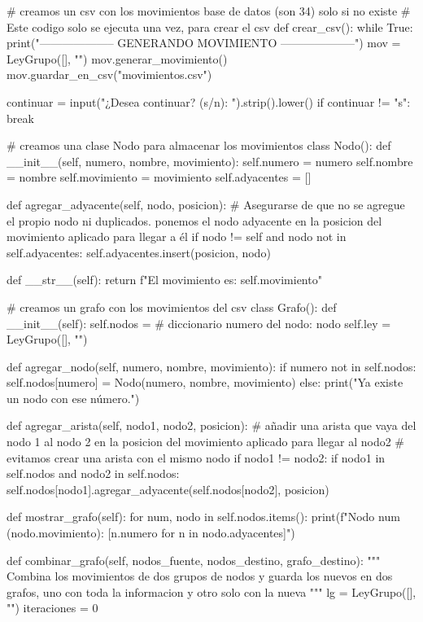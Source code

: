 # creamos un csv con los movimientos base de datos (son 34) solo si no existe
# Este codigo solo se ejecuta una vez, para crear el csv
def crear_csv():
    while True:
        print("-------------------- GENERANDO MOVIMIENTO --------------------")
        mov = LeyGrupo([], "")
        mov.generar_movimiento()
        mov.guardar_en_csv("movimientos.csv")
        
        continuar = input("¿Desea continuar? (s/n): ").strip().lower()
        if continuar != "s":
            break
        

# creamos una clase Nodo para almacenar los movimientos
class Nodo():
    def __init__(self, numero, nombre, movimiento):
        self.numero = numero
        self.nombre = nombre
        self.movimiento = movimiento
        self.adyacentes = []
    
    def agregar_adyacente(self, nodo, posicion):
        # Asegurarse de que no se agregue el propio nodo ni duplicados. ponemos el nodo adyacente en la posicion del movimiento aplicado para llegar a él
        if nodo != self and nodo not in self.adyacentes:
            self.adyacentes.insert(posicion, nodo)
            
    def __str__(self):
        return f"El movimiento es: {self.movimiento}"    

# creamos un grafo con los movimientos del csv
class Grafo():
    def __init__(self):
        self.nodos = {} # diccionario {numero del nodo: nodo}
        self.ley = LeyGrupo([], "")
    
    def agregar_nodo(self, numero, nombre, movimiento):
        if numero not in self.nodos:
            self.nodos[numero] = Nodo(numero, nombre, movimiento)
        else:
            print("Ya existe un nodo con ese número.")
    
    def agregar_arista(self, nodo1, nodo2, posicion):
        # añadir una arista que vaya del nodo 1 al nodo 2 en la posicion del movimiento aplicado para llegar al nodo2
        # evitamos crear una arista con el mismo nodo
        if nodo1 != nodo2:
            if nodo1 in self.nodos and nodo2 in self.nodos:
                self.nodos[nodo1].agregar_adyacente(self.nodos[nodo2], posicion)            
    
    def mostrar_grafo(self):
        for num, nodo in self.nodos.items():
            print(f"Nodo {num} ({nodo.movimiento}): {[n.numero for n in nodo.adyacentes]}")           
   
    def combinar_grafo(self, nodos_fuente, nodos_destino, grafo_destino):
        """
        Combina los movimientos de dos grupos de nodos y guarda los nuevos en dos grafos, uno con toda la informacion y otro solo con la nueva
        """
        lg = LeyGrupo([], "")
        iteraciones = 0

